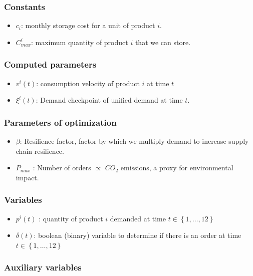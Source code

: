 \documentclass[11pt,twocolumn]{article}
\begin{document}
\subsubsection{Constants}
\begin{itemize}
	\item $c_i$: monthly storage cost for a unit of product  $i$.
	\item $C_{max}^{i}$: maximum quantity of product $i$ that we can store.
\end{itemize}

\subsubsection{Computed parameters}
\begin{itemize}
	\item  $v^{i}\left( t \right) $: consumption velocity of product $i$ at time  $t$
	\item $\xi^{i}\left( t \right) $: Demand checkpoint of unified demand at time $t$.
\end{itemize}


\subsubsection{Parameters of optimization}
\begin{itemize}
	\item $\beta$: Resilience factor, factor by which we multiply demand to increase supply chain resilience.
	\item  $P_{max}$ : Number of orders $\propto$ $CO_2$ emissions, a proxy for environmental impact.
\end{itemize}

\subsubsection{Variables}
\begin{itemize}
	\item $p^{i}\left( t \right) $ : quantity of product $i$ demanded at time  $t \in \left\{ 1,\ldots,12 \right\} $
	\item  $\delta\left( t \right) $: boolean (binary) variable to determine if there is an order at time \qquad \qquad $t \in \left\{ 1,\ldots,12 \right\} $
\end{itemize}

\subsubsection{Auxiliary variables}
\end{document}
